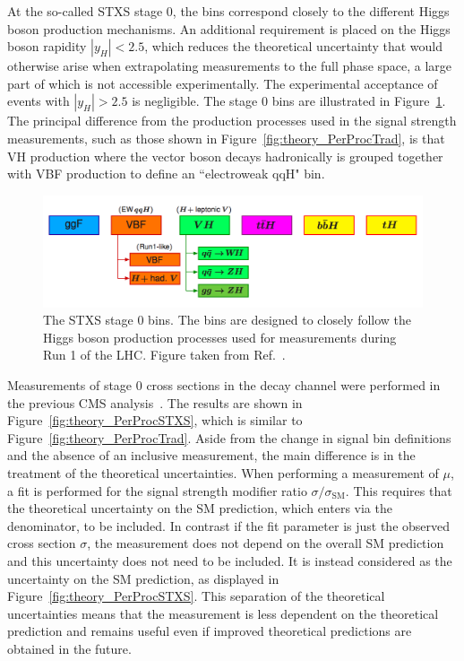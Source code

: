 At the so-called STXS stage 0, 
the bins correspond closely to the different Higgs boson production mechanisms.
An additional requirement is placed on the Higgs boson rapidity $|y_H| < 2.5$, 
which reduces the theoretical uncertainty 
that would otherwise arise when extrapolating measurements to the full phase space,
a large part of which is not accessible experimentally.
The experimental acceptance of \Hgg events with $|y_H| > 2.5$ is negligible.
The stage 0 bins are illustrated in Figure~\ref{fig:theory_stage0}.
The principal difference from the production processes used in the signal strength measurements,
such as those shown in Figure~\ref{fig:theory_PerProcTrad},
is that VH production where the vector boson decays hadronically is grouped together with 
VBF production to define an ``electroweak qqH" bin.

\begin{figure}[hptb]
  \centering
  \includegraphics[width=\textwidth]{Figures/Theory/stage0.png}
  \caption[Stage 0 STXS bins.]
  {
    The STXS stage 0 bins. 
    The bins are designed to closely follow the Higgs boson production processes
    used for measurements during Run 1 of the LHC.
    Figure taken from Ref.~\cite{YR4}.
  }
  \label{fig:theory_stage0}
\end{figure}

Measurements of stage 0 cross sections in the \Hgg decay channel 
were performed in the previous CMS \Hgg analysis~\cite{HIG-16-040}.
The results are shown in Figure~\ref{fig:theory_PerProcSTXS}, 
which is similar to Figure~\ref{fig:theory_PerProcTrad}.
Aside from the change in signal bin definitions and the absence of an inclusive measurement, 
the main difference is in the treatment of the theoretical uncertainties.
When performing a measurement of $\mu$, 
a fit is performed for the signal strength modifier ratio $\sigma/\sigma_{\textrm{SM}}$. 
This requires that the theoretical uncertainty on the SM prediction, 
which enters via the denominator, to be included.
In contrast if the fit parameter is just the observed cross section $\sigma$, 
the measurement does not depend on the overall SM prediction 
and this uncertainty does not need to be included.
It is instead considered as the uncertainty on the SM prediction, 
as displayed in Figure~\ref{fig:theory_PerProcSTXS}.
This separation of the theoretical uncertainties means that the measurement is less dependent 
on the theoretical prediction and remains useful 
even if improved theoretical predictions are obtained in the future.


